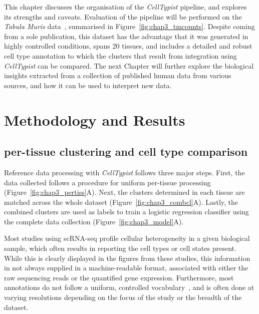 This chapter discusses the organisation of the \textit{CellTypist} pipeline, and explores its strengths and caveats. Evaluation of the pipeline will be performed on the \textit{Tabula Muris} data~\citep{noauthor_single-cell_2018}, summarised in Figure~\ref{fig:chap3_tmcounts}. Despite coming from a sole publication, this dataset has the advantage that it was generated in highly controlled conditions, spans 20 tissues, and includes a detailed and robust cell type annotation to which the clusters that result from integration using \textit{CellTypist} can be compared. The next Chapter will further explore the biological insights extracted from a collection of published human data from various sources, and how it can be used to interpret new data.



\section{Methodology and Results}
\label{section3.2}
\subsection{per-tissue clustering and cell type comparison}
\label{section3.2.1}
Reference data processing with \textit{CellTypist} follows three major steps. First, the data collected follows a procedure for uniform per-tissue processing (Figure~\ref{fig:chap3_pertiss}A). Next, the clusters determined in each tissue are matched across the whole dataset (Figure~\ref{fig:chap3_combcl}A). Lastly, the combined clusters are used as labels to train a logistic regression classifier using the complete data collection (Figure~\ref{fig:chap3_model}A).

Most studies using scRNA-seq profile cellular heterogeneity in a given biological sample, which often results in reporting the cell types or cell states present. While this is clearly displayed in the figures from these studies, this information in not always supplied in a machine-readable format, associated with either the raw sequencing reads or the quantified gene expression. Furthermore, most annotations do not follow a uniform, controlled vocabulary~\citep{bard_ontology_2005}, and is often done at varying resolutions depending on the focus of the study or the breadth of the dataset.

